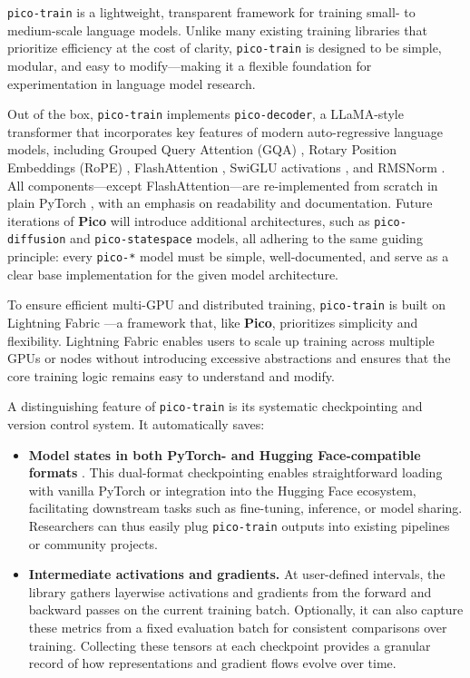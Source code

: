 {\texttt{pico-train} is a lightweight, transparent framework for training small- to medium-scale language models. Unlike many existing training libraries that prioritize efficiency at the cost of clarity, \texttt{pico-train} is designed to be simple, modular, and easy to modify—making it a flexible foundation for experimentation in language model research.

Out of the box, \texttt{pico-train} implements \texttt{pico-decoder}, a LLaMA-style transformer \citep{touvron2023llama} that incorporates key features of modern auto-regressive language models, including Grouped Query Attention (GQA) \citep{ainslie2023gqa}, Rotary Position Embeddings (RoPE) \citep{su2024rope}, FlashAttention \citep{dao2022flashattention}, SwiGLU activations \citep{shazeer2020glu}, and RMSNorm \citep{zhang2019rmsnorm}. All components—except FlashAttention—are re-implemented from scratch in plain PyTorch \citep{paszke2017pytorch}, with an emphasis on readability and documentation. Future iterations of \textbf{Pico} will introduce additional architectures, such as \texttt{pico-diffusion} and \texttt{pico-statespace} models, all adhering to the same guiding principle: every \texttt{pico-*} model must be simple, well-documented, and serve as a clear base implementation for the given model architecture.

To ensure efficient multi-GPU and distributed training, \texttt{pico-train} is built on Lightning Fabric \citep{lightning-fabric}—a framework that, like \textbf{Pico}, prioritizes simplicity and flexibility. Lightning Fabric enables users to scale up training across multiple GPUs or nodes without introducing excessive abstractions and ensures that the core training logic remains easy to understand and modify.

A distinguishing feature of \texttt{pico-train} is its systematic checkpointing and version control system. It automatically saves:
\begin{itemize}
    \item \textbf{Model states in both PyTorch- and Hugging Face-compatible formats} \citep{huggingface}. This dual-format checkpointing enables straightforward loading with vanilla PyTorch or integration into the Hugging Face ecosystem, facilitating downstream tasks such as fine-tuning, inference, or model sharing. Researchers can thus easily plug \texttt{pico-train} outputs into existing pipelines or community projects.

    \item \textbf{Intermediate activations and gradients.} At user-defined intervals, the library gathers layerwise activations and gradients from the forward and backward passes on the current training batch. Optionally, it can also capture these metrics from a fixed evaluation batch for consistent comparisons over training. Collecting these tensors at each checkpoint provides a granular record of how representations and gradient flows evolve over time.


\end{itemize}}

